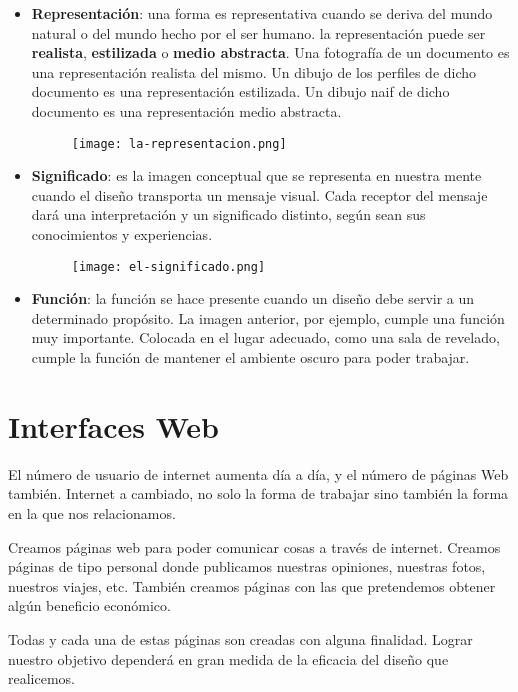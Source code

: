 \begin{itemize}
    \item \textbf{Representación}: una forma es representativa cuando se deriva del mundo natural o del mundo hecho por el ser humano. la representación puede ser \textbf{realista}, \textbf{estilizada} o \textbf{medio abstracta}. Una fotografía de un documento es una representación realista del mismo. Un dibujo de los perfiles de dicho documento es una representación estilizada. Un dibujo naif de dicho documento es una representación medio abstracta.

    \begin{figure}[H]
        \centering
        \texttt{[image: la-representacion.png]}
    \end{figure}

    \item \textbf{Significado}: es la imagen conceptual que se representa en nuestra mente cuando el diseño transporta un mensaje visual. Cada receptor del mensaje dará una interpretación y un significado distinto, según sean sus conocimientos y experiencias.

    \begin{figure}[H]
        \centering
        \texttt{[image: el-significado.png]}
    \end{figure}

    \item \textbf{Función}: la función se hace presente cuando un diseño debe servir a un determinado propósito. La imagen anterior, por ejemplo, cumple una función muy importante. Colocada en el lugar adecuado, como una sala de revelado, cumple la función de mantener el ambiente oscuro para poder trabajar.
\end{itemize}

\section{Interfaces Web}
El número de usuario de internet aumenta día a día, y el número de páginas Web también. Internet a cambiado, no solo la forma de trabajar sino también la forma en la que nos relacionamos.

Creamos páginas web para poder comunicar cosas a través de internet. Creamos páginas de tipo personal donde publicamos nuestras opiniones, nuestras fotos, nuestros viajes, etc. También creamos páginas con las que pretendemos obtener algún beneficio económico.

Todas y cada una de estas páginas son creadas con alguna finalidad. Lograr nuestro objetivo dependerá en gran medida de la eficacia del diseño que realicemos.

